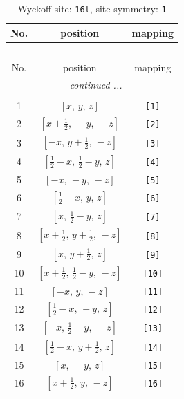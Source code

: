 \documentclass[fleqn,8pt]{jsarticle}
\begin{document}
\begin{longtable}{ccc}
\caption{Wyckoff site: {\tt 16l}, site symmetry: {\tt 1}}
 \\
 \hline \hline
No. & position & mapping \\ \hline \endfirsthead

\multicolumn{2}{l}{\tablename\ \thetable{}} \\
 \hline \hline
No. & position & mapping \\ \hline \endhead

 \hline \hline
\multicolumn{2}{r}{\footnotesize\it continued ...} \\ \endfoot

 \hline \hline
\multicolumn{2}{r}{} \\ \endlastfoot

1 & $\left[ x,\, y,\, z \right]$ & {\tt [1]} \\ \hline
2 & $\left[ x + \frac{1}{2},\, - y,\, - z \right]$ & {\tt [2]} \\ \hline
3 & $\left[ - x,\, y + \frac{1}{2},\, - z \right]$ & {\tt [3]} \\ \hline
4 & $\left[ \frac{1}{2} - x,\, \frac{1}{2} - y,\, z \right]$ & {\tt [4]} \\ \hline
5 & $\left[ - x,\, - y,\, - z \right]$ & {\tt [5]} \\ \hline
6 & $\left[ \frac{1}{2} - x,\, y,\, z \right]$ & {\tt [6]} \\ \hline
7 & $\left[ x,\, \frac{1}{2} - y,\, z \right]$ & {\tt [7]} \\ \hline
8 & $\left[ x + \frac{1}{2},\, y + \frac{1}{2},\, - z \right]$ & {\tt [8]} \\ \hline
9 & $\left[ x,\, y + \frac{1}{2},\, z \right]$ & {\tt [9]} \\ \hline
10 & $\left[ x + \frac{1}{2},\, \frac{1}{2} - y,\, - z \right]$ & {\tt [10]} \\ \hline
11 & $\left[ - x,\, y,\, - z \right]$ & {\tt [11]} \\ \hline
12 & $\left[ \frac{1}{2} - x,\, - y,\, z \right]$ & {\tt [12]} \\ \hline
13 & $\left[ - x,\, \frac{1}{2} - y,\, - z \right]$ & {\tt [13]} \\ \hline
14 & $\left[ \frac{1}{2} - x,\, y + \frac{1}{2},\, z \right]$ & {\tt [14]} \\ \hline
15 & $\left[ x,\, - y,\, z \right]$ & {\tt [15]} \\ \hline
16 & $\left[ x + \frac{1}{2},\, y,\, - z \right]$ & {\tt [16]} \\
\end{longtable}
\end{document}
